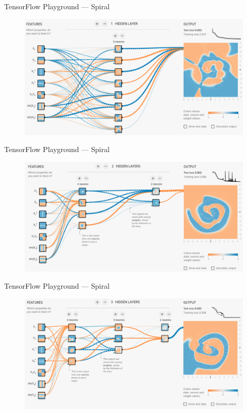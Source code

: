 \documentclass[lualatex, aspectratio=169]{beamer}
\begin{document}
\begin{frame}{TensorFlow Playground --- Spiral}

  \begin{figure}
    \centering
    \includegraphics[height=0.75\pageheight]{assets/1-hidden.png}
  \end{figure}

\end{frame}


\begin{frame}{TensorFlow Playground --- Spiral}

  \begin{figure}
    \centering
    \includegraphics[height=0.75\pageheight]{assets/2-hidden.png}
  \end{figure}

\end{frame}


\begin{frame}{TensorFlow Playground --- Spiral}

  \begin{figure}
    \centering
    \includegraphics[height=0.75\pageheight]{assets/3-hidden.png}
  \end{figure}

\end{frame}
\end{document}
